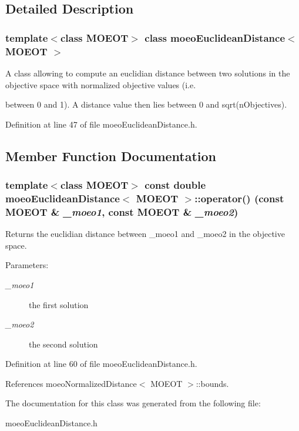\subsection{Detailed Description}
\subsubsection*{template$<$class MOEOT$>$ class moeo\-Euclidean\-Distance$<$ MOEOT $>$}

A class allowing to compute an euclidian distance between two solutions in the objective space with normalized objective values (i.e. 

between 0 and 1). A distance value then lies between 0 and sqrt(n\-Objectives). 



Definition at line 47 of file moeo\-Euclidean\-Distance.h.

\subsection{Member Function Documentation}
\subsubsection{\setlength{\rightskip}{0pt plus 5cm}template$<$class MOEOT$>$ const double \bf{moeo\-Euclidean\-Distance}$<$ MOEOT $>$::operator() (const MOEOT \& {\em \_\-moeo1}, const MOEOT \& {\em \_\-moeo2})\hspace{0.3cm}{\tt  [inline]}}\label{classmoeoEuclideanDistance_20ff559e95da92a46990eb0658f018f1}


Returns the euclidian distance between \_\-moeo1 and \_\-moeo2 in the objective space. 

\begin{Desc}
\item[Parameters:]
\begin{description}
\item[{\em \_\-moeo1}]the first solution \item[{\em \_\-moeo2}]the second solution \end{description}
\end{Desc}


Definition at line 60 of file moeo\-Euclidean\-Distance.h.

References moeo\-Normalized\-Distance$<$ MOEOT $>$::bounds.

The documentation for this class was generated from the following file:\begin{CompactItemize}
\item 
moeo\-Euclidean\-Distance.h\end{CompactItemize}
